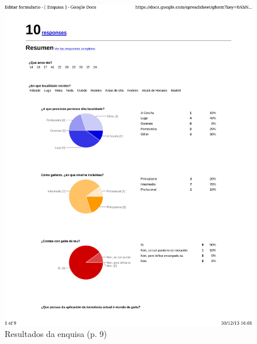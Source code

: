 \begin{figure}
 \centering
 \includegraphics[scale=0.7,page=9,keepaspectratio=true]{./imagenes/enquisa.pdf}
 \caption{Resultados da enquisa (p. 9)}
 \label{figura:ResultadosEnquisa9}
\end{figure}